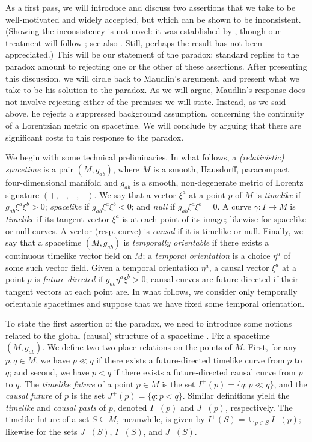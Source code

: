 \documentclass[authoryear,12pt,3p]{jowarticle}
\begin{document}
As a first pass, we will introduce and discuss two assertions that we take to be well-motivated and widely accepted, but which can be shown to be inconsistent.  (Showing the inconsistency is not novel: it was established by \citet{Kodama}, though our treatment will follow \citet{Wald1984}; see also \citet{Earman}.  Still, perhaps the result has not been appreciated.)  This will be our statement of the paradox; standard replies to the paradox amount to rejecting one or the other of these assertions.  After presenting this discussion, we will circle back to Maudlin's argument, and present what we take to be his solution to the paradox.  As we will argue, Maudlin's response does not involve rejecting either of the premises we will state.  Instead, as we said above, he rejects a suppressed background assumption, concerning the continuity of a Lorentzian metric on spacetime.  We will conclude by arguing that there are significant costs to this response to the paradox.

We begin with some technical preliminaries.  In what follows, a \emph{(relativistic) spacetime} is a pair $(M,g_{ab})$, where $M$ is a smooth, Hausdorff, paracompact four-dimensional manifold and $g_{ab}$ is a smooth, non-degenerate metric of Lorentz signature $(+,-,-,-)$.  We say that a vector $\xi^a$ at a point $p$ of $M$ is \emph{timelike} if $g_{ab}\xi^a\xi^b > 0$; \emph{spacelike} if $g_{ab}\xi^a\xi^b<0$; and \emph{null} if $g_{ab}\xi^a\xi^b=0$.  A curve $\gamma:I\rightarrow M$ is \emph{timelike} if its tangent vector $\xi^a$ is at each point of its image; likewise for spacelike or null curves.  A vector (resp. curve) is \emph{causal} if it is timelike or null.  Finally, we say that a spacetime $(M,g_{ab})$ is \emph{temporally orientable} if there exists a continuous timelike vector field on $M$; a \emph{temporal orientation} is a choice $\eta^a$ of some such vector field.  Given a temporal orientation $\eta^a$, a causal vector $\xi^a$ at a point $p$ is \emph{future-directed} if $g_{ab}\eta^a\xi^b > 0$; causal curves are future-directed if their tangent vectors at each point are.  In what follows, we consider only temporally orientable spacetimes and suppose that we have fixed some temporal orientation.

To state the first assertion of the paradox, we need to introduce some notions related to the global (causal) structure of a spacetime \citep{Geroch+Horowitz, Hawking+Ellis, ManchakGS}.  Fix a spacetime $(M,g_{ab})$.  We define two two-place relations on the points of $M$.  First, for any $p,q\in M$, we have $p\ll q$ if there exists a future-directed timelike curve from $p$ to $q$; and second, we have $p< q$ if there exists a future-directed causal curve from $p$ to $q$.  The \emph{timelike future} of a point $p\in M$ is the set $I^+(p)=\{q:p\ll q\}$, and the \emph{causal future} of $p$ is the set $J^+(p)=\{q:p < q\}$.  Similar definitions yield the \emph{timelike} and \emph{causal pasts} of $p$, denoted $I^-(p)$ and $J^-(p)$, respectively.  The timelike future of a set $S\subseteq M$, meanwhile, is given by $I^+(S) = \cup_{p\in S}I^+(p)$; likewise for the sets $J^+(S)$, $I^-(S)$, and $J^-(S)$.
\end{document}
